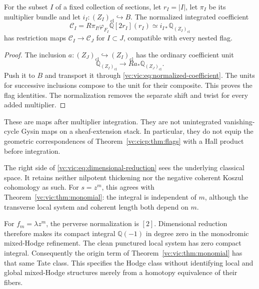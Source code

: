 \begin{corollary}\label{vc:vic:cor:integrated-constraints}
For the subset $I$ of a fixed collection of sections, let
$r_I=|I|$, let $\pi_I$ be its multiplier bundle and let
$i_I:(Z_I)_{\mathrm{cl}}\hookrightarrow B$.
The normalized integrated coefficient
\begin{equation}\label{vc:vic:eq:normalized-coefficient}
 \mathcal C_I=
 R\pi_{I!}\varphi_{F_I}\mathbb Q[2r_I](r_I)
       \simeq i_{I*}\mathbb Q_{(Z_I)_{\mathrm{cl}}}
\end{equation}
has restriction maps $\mathcal C_I\to\mathcal C_J$ for
$I\subset J$, compatible with every nested flag.
\end{corollary}

\begin{proof}
The inclusion
$a:(Z_J)_{\mathrm{cl}}\hookrightarrow(Z_I)_{\mathrm{cl}}$
has the ordinary coefficient unit
\[
 \mathbb Q_{(Z_I)_{\mathrm{cl}}}
       \longrightarrow Ra_*\mathbb Q_{(Z_J)_{\mathrm{cl}}}.
\]
Push it to $B$ and transport it through
\eqref{vc:vic:eq:normalized-coefficient}.
The units for successive inclusions compose to the unit
for their composite. This proves the flag identities.
The normalization removes the separate shift and twist
for every added multiplier.
\end{proof}

These are maps after multiplier integration. They are not
unintegrated vanishing-cycle Gysin maps on a sheaf-extension
stack. In particular, they do not equip the geometric
correspondences of Theorem~\ref{vc:cicp:thm:flags} with a Hall
product before integration.

The right side of \eqref{vc:vic:eq:dimensional-reduction} sees
the underlying classical space. It retains neither nilpotent
thickening nor the negative coherent Koszul cohomology as such.
For $s=z^m$, this agrees with
Theorem~\ref{vc:vic:thm:monomial}: the integral is independent
of $m$, although the transverse local system and coherent
length both depend on $m$.

For $f_m=\lambda z^m$, the perverse normalization is
$[2]$. Dimensional reduction therefore makes its compact
integral $\mathbb Q(-1)$ in degree zero in the monodromic
mixed-Hodge refinement. The clean punctured local system
has zero compact integral. Consequently the origin term
of Theorem~\ref{vc:vic:thm:monomial} has that same Tate class.
This specifies the Hodge class without identifying local
and global mixed-Hodge structures merely from a homotopy
equivalence of their fibers.

